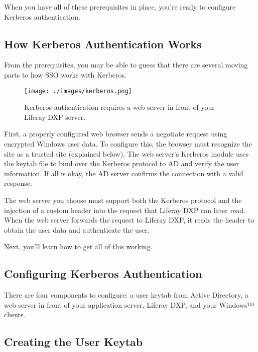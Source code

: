When you have all of these prerequisites in place, you're ready to
configure Kerberos authentication.

\subsection{How Kerberos Authentication
Works}\label{how-kerberos-authentication-works}

From the prerequisites, you may be able to guess that there are several
moving parts to how SSO works with Kerberos.

\begin{figure}
\centering
\texttt{[image: ./images/kerberos.png]}
\caption{Kerberos authentication requires a web server in front of your
Liferay DXP server.}
\end{figure}

First, a properly configured web browser sends a negotiate request using
encrypted Windows user data. To configure this, the browser must
recognize the site as a trusted site (explained below). The web server's
Kerberos module uses the keytab file to bind over the Kerberos protocol
to AD and verify the user information. If all is okay, the AD server
confirms the connection with a valid response.

The web server you choose must support both the Kerberos protocol and
the injection of a custom header into the request that Liferay DXP can
later read. When the web server forwards the request to Liferay DXP, it
reads the header to obtain the user data and authenticate the user.

Next, you'll learn how to get all of this working.

\subsection{Configuring Kerberos
Authentication}\label{configuring-kerberos-authentication}

There are four components to configure: a user keytab from Active
Directory, a web server in front of your application server, Liferay
DXP, and your Windows™ clients.

\subsection{Creating the User Keytab}\label{creating-the-user-keytab}

